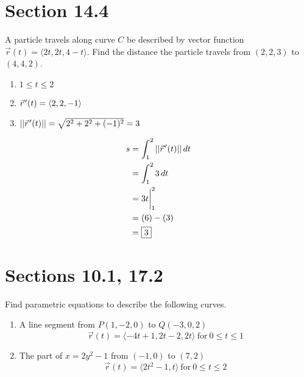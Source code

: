 \documentclass[letter,11pt]{article}
\newcommand{\pvec}[1]{\vec{#1}\mkern2mu\vphantom{#1}}
\begin{document}
\section*{Section 14.4}
A particle travels along curve $C$ be described by vector function $\vec{r}(t) =\langle 2t, 2t, 4-t \rangle$. Find the distance the particle travels from $(2, 2, 3)$ to $(4, 4, 2)$.
\begin{enumerate}[label=\roman*.]
    \item $1\leq t \leq 2$
    \item $\pvec{r}'(t)=\langle 2, 2, -1 \rangle$
    \item $||\pvec{r}'(t)|| = \sqrt{2^2+2^2+(-1)^2} = 3$
\end{enumerate}

\begin{align*}
    s&= \int_{1}^{2} ||\pvec{r}'(t)|| \, dt \\
    &= \int_{1}^{2} 3 \, dt\\
    &= 3t\biggr\rvert_{1}^{2}\\
    & = (6)-(3)\\
    &= \boxed{3}
\end{align*}

\section*{Sections 10.1, 17.2}
Find parametric equations to describe the following curves.
\begin{enumerate}[label=\roman*.]
    \item A line segment from $P(1, -2, 0)$ to $Q(-3, 0, 2)$
    \[\boxed{\vec{r}(t)=\langle-4t+1,2t-2,2t\rangle ~\text{for}~ 0 \leq t \leq 1}\]
    \item The part of $x = 2y^2-1$ from $(-1, 0)$ to $(7, 2)$
    \[\boxed{\vec{r}(t)=\langle2t^{2}-1,t\rangle ~\text{for}~ 0 \leq t \leq 2}\]
\end{enumerate}
\end{document}
